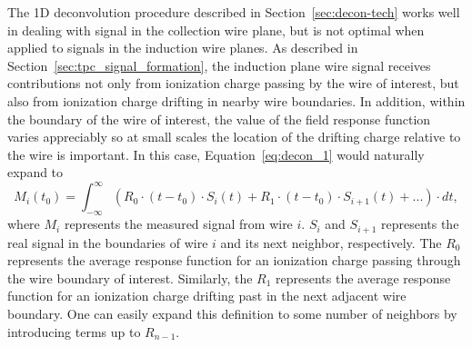 The 1D deconvolution procedure described in Section~\ref{sec:decon-tech} %
works well in dealing with signal in the collection wire plane, but is not 
optimal when applied to signals in the induction wire planes. 
As described in Section~\ref{sec:tpc_signal_formation}, the induction plane wire 
signal receives contributions not only from ionization charge 
passing by the wire of interest, but also from ionization charge drifting in 
nearby wire boundaries. In addition, within the boundary of the wire of 
interest, the value of the field response function varies appreciably 
 so at small scales the location of the drifting charge relative to the wire 
is important. In this case, Equation~\ref{eq:decon_1} would naturally expand to 
\begin{equation}\label{eq:decon_2d_1}
M_i(t_0) = \int_{-\infty}^{\infty} \left( R_0 \cdot (t-t_0) \cdot S_i(t) + 
R_1 \cdot (t-t_0) \cdot S_{i+1} (t) + ...\right) \cdot dt,
\end{equation}
where $M_i$ represents the measured signal from wire $i$.  $S_i$ and
$S_{i+1}$ represents the real signal in the boundaries of wire $i$ and
its next neighbor, respectively.
The $R_0$ represents the average response function for an ionization
charge passing through the wire boundary of interest.
Similarly, the $R_1$ represents the average response function for an
ionization charge drifting past in the next adjacent wire boundary. One can
easily expand this definition to some number of neighbors by introducing terms up 
to $R_{n-1}$.

